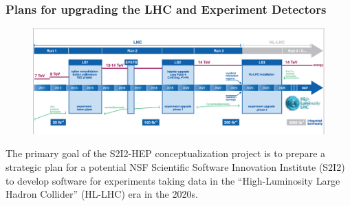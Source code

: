 \begin{frame}
\frametitle{Plans for upgrading the LHC and Experiment Detectors}

\begin{figure}[htbp]
\begin{center}
\includegraphics[width=1.0\textwidth]{images/lhc-upgrade-timeline-detail.png}
\end{center}
\end{figure}

\small{The primary goal of the S2I2-HEP conceptualization project is to prepare a strategic plan for a potential NSF Scientific Software Innovation Institute (S2I2) to develop software for experiments taking data in the ``High-Luminosity Large Hadron Collider'' (HL-LHC) era in the 2020s.}

\end{frame}


